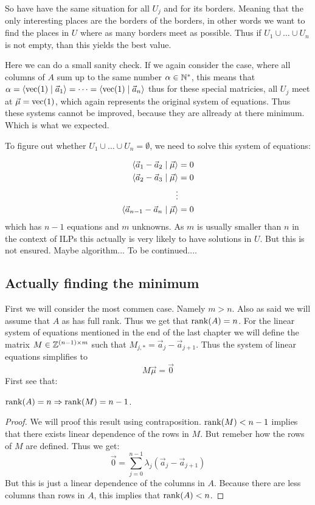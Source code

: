 So have have the same situation for all $U_j$ and for its borders. Meaning that the only interesting places are the borders of the borders, in other words we want to find the places in $U$ where as many borders meet as possible. Thus if $U_1 \cup \dots \cup U_n$ is not empty, than this yields the best value.

Here we can do a small sanity check. If we again consider the case, where all columns of $A$ sum up to the same number $\alpha \in \mathbb{N}^*$, this means that $\alpha = \langle \operatorname{vec}(1) \mid \vec a_1 \rangle = \dots = \langle \operatorname{vec}(1) \mid \vec a_n \rangle$ thus for these special matricies, all $U_j$ meet at $\vec \mu = \operatorname{vec}(1)$, which again represents the original system of equations. Thus these systems cannot be improved, because they are allready at there minimum. Which is what we expected.

To figure out whether $U_1 \cup \dots \cup U_n = \emptyset$, we need to solve this system of equations:

\begin{align*}
    \langle \vec a_1 - \vec a_2 \mid \vec \mu \rangle &= 0\\
    \langle \vec a_2 - \vec a_3 \mid \vec \mu \rangle &= 0\\
    \vdots & \\
    \langle \vec a_{n-1} - \vec a_{n} \mid \vec \mu \rangle &= 0
\end{align*}
which has $n-1$ equations and $m$ unknowns. As $m$ is usually smaller than $n$ in the context of ILPs this actually is very likely to have solutions in $U$. But this is not ensured. Maybe algorithm... To be continued....

\subsection{Actually finding the minimum}
First we will consider the most commen case. Namely $m > n$. Also as said we will assume that $A$ as has full rank. Thus we get that $\operatorname{rank}(A) = n$. For the linear system of equations mentioned in the end of the last chapter we will define the matrix $M \in \mathbb{Z}^{(n-1) \times m}$ such that $M_{j,*} = \vec a_j - \vec a_{j+1}$. Thus the system of linear equations simplifies to
$$M\vec\mu = \vec0$$
First see that:

\begin{lemma}
    $\operatorname{rank}(A) = n \Rightarrow \operatorname{rank}(M) = n - 1$.
\end{lemma}

\begin{proof}
    We will proof this result using contraposition. $\operatorname{rank}(M) < n-1$ implies that there exists linear dependence of the rows in $M$. But remeber how the rows of $M$ are defined. Thus we get:
    $$\vec 0 = \sum_{j=0}^{n-1} \lambda_j (\vec a_j - \vec a_{j+1})$$
    But this is just a linear dependence of the columns in $A$. Because there are less columns than rows in $A$, this implies that $\operatorname{rank}(A) < n$. 
\end{proof}

